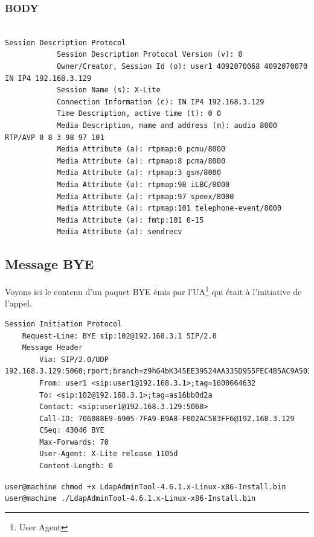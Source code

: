 \documentclass[12pt,a4paper,notitlepage]{article}
\begin{document}
\subsubsection{BODY}
\begin{lstlisting}[title=Contenu du BODY d'un paquet INVITE de SIP]

Session Description Protocol
            Session Description Protocol Version (v): 0
            Owner/Creator, Session Id (o): user1 4092070068 4092070070 IN IP4 192.168.3.129
            Session Name (s): X-Lite
            Connection Information (c): IN IP4 192.168.3.129
            Time Description, active time (t): 0 0
            Media Description, name and address (m): audio 8000 RTP/AVP 0 8 3 98 97 101
            Media Attribute (a): rtpmap:0 pcmu/8000
            Media Attribute (a): rtpmap:8 pcma/8000
            Media Attribute (a): rtpmap:3 gsm/8000
            Media Attribute (a): rtpmap:98 iLBC/8000
            Media Attribute (a): rtpmap:97 speex/8000
            Media Attribute (a): rtpmap:101 telephone-event/8000
            Media Attribute (a): fmtp:101 0-15
            Media Attribute (a): sendrecv
\end{lstlisting}

\subsection{Message BYE} 
Voyons ici le contenu d'un paquet BYE émis par l'UA\footnote{User Agent} qui était à l'initiative de l'appel.

\begin{lstlisting}[title=Contenu d'un paquet BYE]
Session Initiation Protocol
    Request-Line: BYE sip:102@192.168.3.1 SIP/2.0
    Message Header
        Via: SIP/2.0/UDP 192.168.3.129:5060;rport;branch=z9hG4bK345EE39524AA335D955FEC4B5AC9A503
        From: user1 <sip:user1@192.168.3.1>;tag=1600664632
        To: <sip:102@192.168.3.1>;tag=as16bb0d2a
        Contact: <sip:user1@192.168.3.129:5060>
        Call-ID: 706088E9-6905-7FA9-B9A8-F002AC583FF6@192.168.3.129
        CSeq: 43046 BYE
        Max-Forwards: 70
        User-Agent: X-Lite release 1105d
        Content-Length: 0
\end{lstlisting}

\noindent \texttt{user@machine  chmod +x LdapAdminTool-4.6.1.x-Linux-x86-Install.bin \\
user@machine  ./LdapAdminTool-4.6.1.x-Linux-x86-Install.bin}
\bigskip
\end{document}

